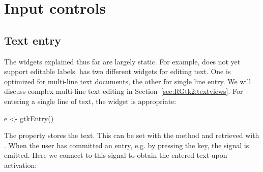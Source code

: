 




\section{Input controls}

\subsection{Text entry}
\label{sec:RGtk2:gtkEntry}

The widgets explained thus far are largely static. For example, \GTK\/
does not yet support editable labels. \GTK\/ has two different widgets
for editing text. One is optimized for multi-line text documents, the
other for single line entry. We will discuss complex multi-line text
editing in Section~\ref{sec:RGtk2:textviews}. For entering a single
line of text, the  widget is appropriate:
\begin{Schunk}
\begin{Sinput}
 e <- gtkEntry()
\end{Sinput}
\end{Schunk}

The  property stores the text. This can be set with the
method  and retrieved with
.  When the user has committed an entry,
e.g. by pressing the  key, the  signal is
emitted. Here we connect to this signal to obtain the entered text upon
activation:
\begin{Schunk}
\end{Schunk}


